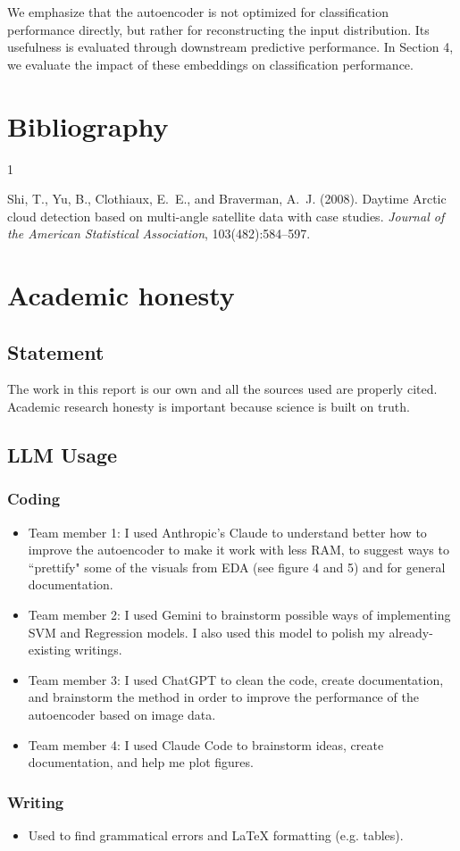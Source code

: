 \documentclass[10pt,letterpaper]{article}
\begin{document}
We emphasize that the autoencoder is not optimized for classification performance directly, but rather for reconstructing the input distribution. Its usefulness is evaluated through downstream predictive performance. In Section 4, we evaluate the impact of these embeddings on classification performance.



\newpage
\section{Bibliography}
\begin{thebibliography}{1}

Shi, T., Yu, B., Clothiaux, E.~E., and Braverman, A.~J. (2008).
\newblock Daytime {Arctic} cloud detection based on multi-angle satellite data with case studies.
\newblock \textit{Journal of the American Statistical Association}, 103(482):584--597.

\end{thebibliography}



\appendix
\section{Academic honesty}
\subsection{Statement}
The work in this report is our own and all the sources used are properly cited. Academic research honesty is important because science is built on truth.
\subsection{LLM Usage}


\subsubsection*{Coding}
\begin{itemize}
    \item Team member 1: I used Anthropic's Claude to understand better how to improve the autoencoder to make it work with less RAM, to suggest ways to ``prettify" some of the visuals from EDA (see figure 4 and 5) and for general documentation.
    \item Team member 2: I used Gemini to brainstorm possible ways of implementing SVM and Regression models. I also used this model to polish my already-existing writings.
    \item Team member 3:  I used ChatGPT to clean the code, create documentation, and brainstorm the method in order to improve the performance of the autoencoder based on image data.
    \item Team member 4:  I used Claude Code to brainstorm ideas, create documentation, and help me plot figures.
\end{itemize}

\subsubsection*{Writing}
\begin{itemize}
    \item Used to find grammatical errors and LaTeX formatting (e.g. tables).
\end{itemize}
\end{document}
